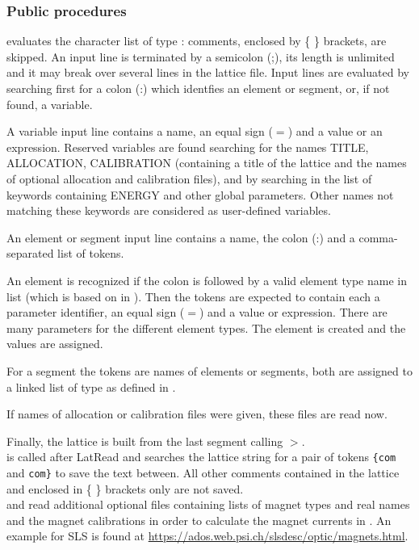\documentclass[12pt]{article}
\newcommand\code[1]{{\tt #1}}
\newcommand\guico[1]{{\color{blue}\code{#1}}}
\newcommand{\unico}[1]{{\color{burntorange}\code{#1}}}
\newcommand{\prcod}[2]{\opauni{#1}$>$\unico{#2}}
\newcommand{\opauni}[1]{\colorbox{orange!30}{{\color{black}\code{#1}}}}
\newcommand{\ouni}[1]{\hyperref[#1]{\opauni{#1}}}
\newcommand{\ppro}[1]{\subsubsection*{Public procedures} #1}
\begin{document}
\ppro{
\unico{Latread} evaluates the character list of type \unico{TextBuffer}: comments, enclosed by \{ \} brackets, are skipped. An input line is terminated by a semicolon (;), its length is unlimited and it may break over several lines in the lattice file.  Input lines are evaluated by searching first for a colon (:) which identfies an element or segment, or, if not found, a variable.

A variable input line contains a name, an equal sign ($=$) and a value or an expression.
Reserved variables are found searching for the names TITLE, ALLOCATION, CALIBRATION (containing a title of the lattice and the names of optional allocation and calibration files), and by searching in the list of keywords \unico{globkeyw} containing ENERGY and other global parameters. Other names not matching these keywords are considered as user-defined variables.

An element or segment input line contains a name, the colon (:) and a comma-separated list of tokens.

An element is recognized if the colon is followed by a valid element type name in list \unico{elemkeyw} (which is based on \unico{ElemName} in \ouni{globlib}). Then the tokens are expected to contain each a parameter identifier, an equal sign ($=$) and a value or expression. There are many parameters for the different element types. The element is created and the values are assigned.

For a segment the tokens are names of elements or segments, both are  assigned to a linked list of type \unico{AbstractEleType} as defined in \ouni{globlib}.

If names of allocation or calibration files were given, these files are read now.

Finally, the lattice is built from the last segment calling \prcod{globlib}{MakeLattice}.\\


\unico{LatReadCom} is called after LatRead and searches the lattice string for a pair of tokens \code{\{com} and \code{com\}} to save the text between. All other comments contained in the lattice and enclosed in \{ \} brackets only are not saved.\\

\unico{ReadAllocation} and \unico{ReadCalibration} read additional optional files containing lists of magnet types and real names and the magnet calibrations in order to calculate the magnet currents in \guico{opacurrents}. 
An example for SLS is found at \url{https://ados.web.psi.ch/slsdesc/optic/magnets.html}. 

}
\end{document}
